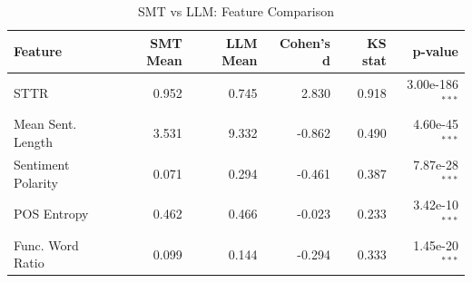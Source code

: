 \begin{table}[h]
\centering
\caption{SMT vs LLM: Feature Comparison}
\begin{tabular}{lrrrrr}
\toprule
Feature & SMT Mean & LLM Mean & Cohen's d & KS stat & p-value \\
\midrule
  STTR & 0.952 & 0.745 & 2.830 & 0.918 & 3.00e-186$^{***}$ \\
  Mean Sent. Length & 3.531 & 9.332 & -0.862 & 0.490 & 4.60e-45$^{***}$ \\
  Sentiment Polarity & 0.071 & 0.294 & -0.461 & 0.387 & 7.87e-28$^{***}$ \\
  POS Entropy & 0.462 & 0.466 & -0.023 & 0.233 & 3.42e-10$^{***}$ \\
  Func. Word Ratio & 0.099 & 0.144 & -0.294 & 0.333 & 1.45e-20$^{***}$ \\
\bottomrule
\end{tabular}
\end{table}